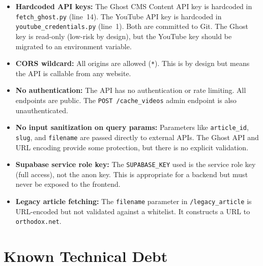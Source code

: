 \documentclass[12pt]{article}
\begin{document}
\begin{itemize}
    \item \textbf{Hardcoded API keys:} The Ghost CMS Content API key is hardcoded in \texttt{fetch\_ghost.py} (line~14). The YouTube API key is hardcoded in \texttt{youtube\_credentials.py} (line~1). Both are committed to Git. The Ghost key is read-only (low-risk by design), but the YouTube key should be migrated to an environment variable.
    \item \textbf{CORS wildcard:} All origins are allowed (\texttt{*}). This is by design but means the API is callable from any website.
    \item \textbf{No authentication:} The API has no authentication or rate limiting. All endpoints are public. The \texttt{POST /cache\_videos} admin endpoint is also unauthenticated.
    \item \textbf{No input sanitization on query params:} Parameters like \texttt{article\_id}, \texttt{slug}, and \texttt{filename} are passed directly to external APIs. The Ghost API and URL encoding provide some protection, but there is no explicit validation.
    \item \textbf{Supabase service role key:} The \texttt{SUPABASE\_KEY} used is the service role key (full access), not the anon key. This is appropriate for a backend but must never be exposed to the frontend.
    \item \textbf{Legacy article fetching:} The \texttt{filename} parameter in \texttt{/legacy\_article} is URL-encoded but not validated against a whitelist. It constructs a URL to \texttt{orthodox.net}.
\end{itemize}

\section{Known Technical Debt}
\end{document}
